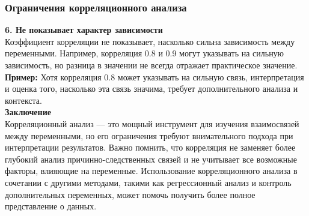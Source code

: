 \documentclass[aspectratio=169]{beamer}
\begin{document}
\begin{frame}
\frametitle{Ограничения корреляционного анализа}
{\bf 6. Не показывает характер зависимости}\\
Коэффициент корреляции не показывает, насколько сильна зависимость между переменными. Например, корреляция 0.8 и 0.9 могут указывать на сильную зависимость, но разница в значении не всегда отражает практическое значение.\\
{\bf Пример:} Хотя корреляция 0.8 может указывать на сильную связь, интерпретация и оценка того, насколько эта связь значима, требует дополнительного анализа и контекста.
\newline\\
{\bf Заключение}\\
Корреляционный анализ — это мощный инструмент для изучения взаимосвязей между переменными, но его ограничения требуют внимательного подхода при интерпретации результатов. Важно помнить, что корреляция не заменяет более глубокий анализ причинно-следственных связей и не учитывает все возможные факторы, влияющие на переменные. Использование корреляционного анализа в сочетании с другими методами, такими как регрессионный анализ и контроль дополнительных переменных, может помочь получить более полное представление о данных.
\end{frame}
\end{document}
